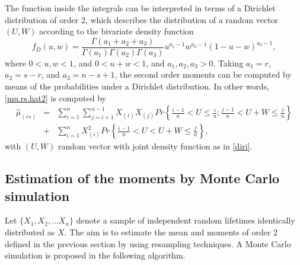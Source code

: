 \documentclass[preprint,12pt]{elsarticle}
\begin{document}
The function inside the integrals can be interpreted in terms  of a Dirichlet distribution of order 2, which describes the distribution of a random vector $(U,W)$ according to the  bivariate density function
\begin{equation}\label{diri}
f_D(u,w)=\frac{\Gamma(a_1+a_2+a_3)}{\Gamma(a_1)\Gamma(a_2)\Gamma(a_3)}u^{a_1-1}w^{a_2-1}(1-u-w)^{a_3-1},
\end{equation}
where $0<u,w<1$, and $0<u+w<1$, and $a_1, a_2, a_3 >0$. Taking $a_1=r$, $a_2=s-r$, and $a_3=n-s+1$, the second order moments can be computed by means of the probabilities  under a Dirichlet distribution. In other words, \eqref{mu.rs.hat2} is computed by 
\begin{eqnarray}\label{mu.rs.hat3}
\nonumber \widehat{\mu}_{(rs)}&=& \sum_{i=1}^{n} \sum_{j=i+1}^{n-1} X_{(i)}X_{(j)} Pr\left\{\frac{i-1}{n} < U \leq \frac{i}{n};\frac{j-1}{n} < U+W \leq \frac{j}{n} \right\}\\
&+&  \sum_{i=1}^n X_{(i)}^2 Pr\left\{\frac{i-1}{n} < U < U+W \leq \frac{j}{n} \right\},
\end{eqnarray}
with $(U,W)$ random vector with joint density function as in \eqref{diri}.




\subsection{Estimation of the moments by Monte Carlo simulation}

Let $\{X_1, X_2, \ldots  X_n\}$ denote a sample of independent random lifetimes identically distributed as $X$. The aim is to estimate the mean and moments of order 2 defined in the previous section by using resampling techniques. A Monte Carlo simulation is proposed in the following algorithm. 
\end{document}
